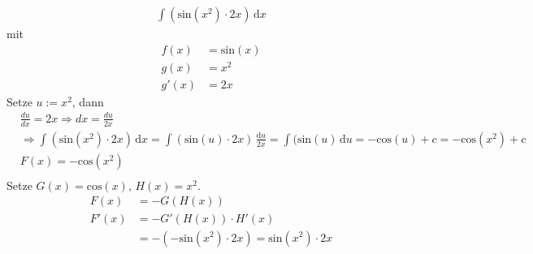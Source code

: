 \begin{align*}
	\int \! (\text{sin}(x^2)\cdot 2x) \, \mathrm{d}x
\end{align*}
mit
\begin{align*}
	f(x) &= \text{sin}(x) \\
	g(x) &= x^2 \\
	g'(x) &= 2x
\end{align*}
Setze $u := x^2$, dann
\begin{align*}
	&\frac{du}{dx} = 2x \Rightarrow dx = \frac{du}{2x} \\
	&\Rightarrow \int \! (\text{sin}(x^2) \cdot 2x) \, \mathrm{d}x = \int \! (\text{sin}(u) \cdot 2x) \, \frac{\mathrm{d}u}{2x} = \int \! (\text{sin}(u) \, \mathrm{d}u = -\text{cos}(u) + c = -\text{cos}(x^2) + c \\
	&F(x) = -\text{cos}(x^2) \\
\end{align*}
Setze $G(x) = \text{cos}(x)$, $H(x) = x^2$.
\begin{align*}
	F(x) &= -G(H(x)) \\
	F'(x) &= -G'(H(x))\cdot H'(x) \\
	&= -(-\text{sin}(x^2)\cdot 2x) = \text{sin}(x^2) \cdot 2x
\end{align*}

